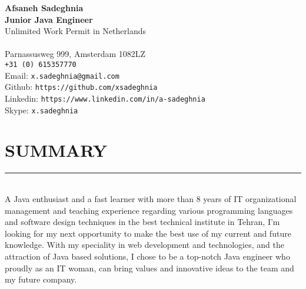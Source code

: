 \documentclass[10pt,a4paper]{article}
\begin{document}
\noindent \textbf{Afsaneh Sadeghnia} \\
\noindent \small \textbf{Junior Java Engineer} \\
\noindent \small Unlimited Work Permit in Netherlands \\ \\
Parnassusweg 999, Amsterdam 1082LZ \\
\texttt{+31 (0) 615357770} \\
Email: \texttt{x.sadeghnia@gmail.com} \\
Github: \texttt{https://github.com/xsadeghnia} \\
Linkedin: \texttt{https://www.linkedin.com/in/a-sadeghnia} \\
Skype: \texttt{x.sadeghnia}

\section{SUMMARY}
\noindent \rule {18.0cm}{0.2pt} \\
A Java enthusiast and a fast learner with more than 8 years of IT organizational management and teaching experience regarding various programming languages and software design techniques in the best technical institute in Tehran, I'm looking for my next opportunity to make the best use of my current and future knowledge. With my speciality in web development and technologies, and the attraction of Java based solutions, I chose to be a top-notch Java engineer who proudly as an IT woman, can bring values and innovative ideas to the team and my future company. 

\small
\end{document}
